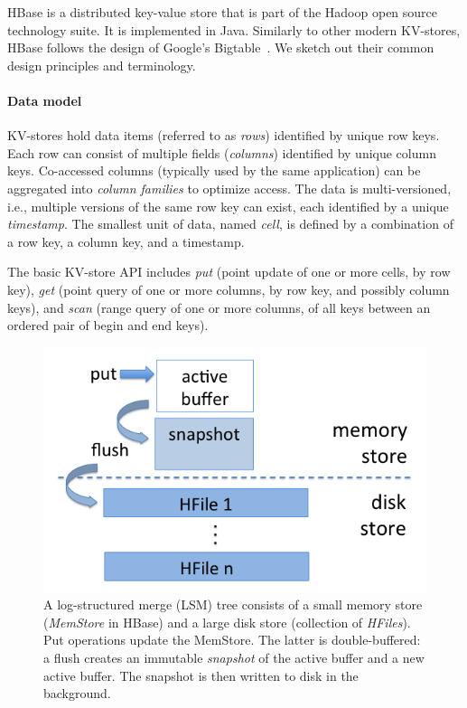 
HBase is a distributed key-value store that is part of the Hadoop open source  technology suite. 
It is implemented in Java. Similarly to other modern KV-stores, HBase follows the design of 
Google's Bigtable~\cite{Chang2008}. We sketch out their common design principles 
and terminology. 

\paragraph{Data model}
KV-stores hold data items (referred to as \emph{rows}) identified by unique 
row keys. Each row can consist of multiple fields (\emph{columns}) identified by unique 
column keys. Co-accessed columns (typically used by the same application) can be 
aggregated into  \emph{column families} to optimize access. The data is multi-versioned, 
i.e., multiple versions of the same row key can exist, each identified by a unique {\em timestamp}. 
The smallest unit of data, named {\em cell}, is defined by a combination of a row key, a
column key, and a timestamp.

The basic KV-store API includes \emph{put} (point update of one or more cells, by row key), 
\emph{get} (point query of one or more columns, by row key, and possibly column keys), 
and \emph{scan} (range query of one or more columns, of all keys between 
an ordered pair of begin and end keys). 

\begin{figure}[tb]
\center
\includegraphics[width=0.9\columnwidth]{LSM} 
\caption{A log-structured merge (LSM) tree consists of a small memory store ({\em MemStore} in HBase) 
and a large disk store (collection of {\em HFiles}). Put operations update the MemStore. The latter is 
double-buffered: a flush creates an immutable \emph{snapshot} of the active buffer and  a new active 
buffer. The snapshot is then written to disk in the background.}
\label{fig:LSM}
\end{figure}

